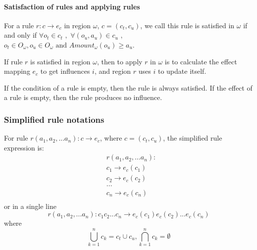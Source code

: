 \documentclass[9pt,a4paper,twoside]{article}
\begin{document}
            \paragraph{Satisfaction of rules and applying rules}  
                       
                For a rule $r: c \rightarrow e_c$ in region $\omega$, $c = (c_t, c_u)$, we call this rule is satisfied in $\omega$ if and only if 
                $\forall o_t \in c_t$ $,$ $ \forall (o_u, a_u) \in c_u$ $,$ $o_t \in O_{\omega}, o_u \in O_{\omega} \text{ and } Amount_\omega(o_u) \geq a_u$.
                
                If rule $r$ is satisfied in region $\omega$, then to apply $r$ in $\omega$ is to calculate the effect mapping $e_c$ to get influences $i$,
                and region $r$ uses $i$ to update itself.
                
                If the condition of a rule is empty, then the rule is always satisfied. If the effect of a rule is empty, then the rule produces no influence.
    
        \subsubsection{Simplified rule notations}
        
            For rule $r(a_1,a_2,...a_n): c \rightarrow e_c$, where $c=(c_t, c_u)$, the simplified rule expression is:
            \begin{equation}
                \begin{aligned}
                    &r(a_1,a_2,...a_n): \\
                    &c_1 \rightarrow e_c(c_1)  \\
                    &c_2 \rightarrow e_c(c_2)  \\
                    &...\\
                    &c_n \rightarrow e_c(c_n)  \\
                \end{aligned}
            \end{equation}
            or in a single line
            \begin{equation}
                r(a_1,a_2,...a_n): c_1c_2...c_n \rightarrow e_c(c_1)e_c(c_2)...e_c(c_n)
            \end{equation}
            where
            \begin{equation}
                \bigcup_{k = 1}^{n}{c_k} = c_t \cup c_u, \bigcap_{k = 1}^{n}{c_k} = \emptyset
            \end{equation}
            
\end{document}
